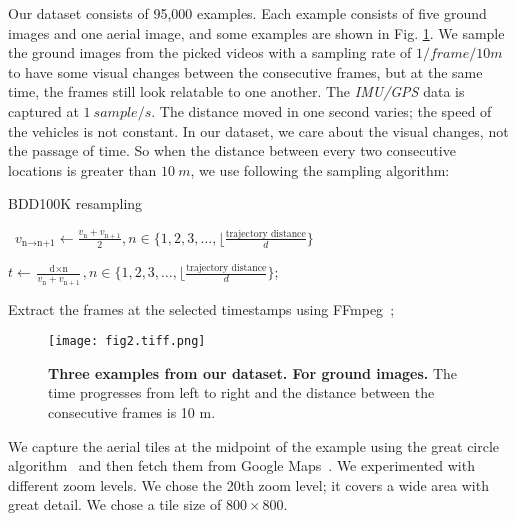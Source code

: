 \documentclass[10pt,letterpaper]{article}
\newif\ifhighlight
\newcommand{\hlb}[1]{\ifhighlight{\hl{#1}}\else{#1}\fi}
\newif\ifmaps
\newcommand{\maps}[1]{\ifmaps{#1}\fi}
\begin{document}
Our dataset consists of 95,000 examples. Each example consists of five ground images and one aerial image, and some examples are shown in \hlb{Fig.} \ref{fig2}. We sample the ground images from the picked videos with a sampling rate of $1 / frame/10 m$ to have some visual changes between the consecutive frames, but at the same time, the frames still look relatable to one another. The \emph{IMU/GPS} data is captured at $1 \ sample/s$. The distance moved in one second varies; the speed of the vehicles is not constant. In our dataset, we care about the visual changes, not the passage of time. So when the distance between every two consecutive locations is greater than $10 \ m$,  we use following the sampling algorithm:

\begin{algorithm}[!h]
\caption{BDD100K resampling}
\
$v_{\text{n} \to \text{n+1}} \gets \frac{v_{\text{n}} + v_{\text{n} + 1}}{2}, n \in \{1, 2, 3, \text{\ldots}, \lfloor\frac{\text{trajectory distance}}{d} \}$ \;

\Comment{To get the timestamp of the nth frame ($t_{\text{n}}$)}

$t \gets \frac{\text{d} \times  \text{n}}{v_{\text{n}} + v_{\text{n} + 1}} , n \in \{1, 2, 3, \text{\ldots}, \lfloor\frac{\text{trajectory distance}}{d} \} $;\

Extract the frames at the selected timestamps using FFmpeg~\cite{bib23};\
\end{algorithm}

\begin{figure}[!ht]
  \caption{{\bf Three examples from our dataset. For ground images.} The time progresses from left to right and the distance between the consecutive frames is 10 m.}
  \texttt{[image: fig2.tiff.png]}
  \label{fig2}
\end{figure}

We capture the aerial tiles at the midpoint of the example using the great circle algorithm~\cite{bib16} and then fetch them from Google Maps~\cite{bib15}. We experimented with different zoom levels\maps{, \hlb{Fig.} \ref{fig3}}. We chose the 20th zoom level; it covers a wide area with great detail. We chose a tile size of  $800 \times 800$\maps{ as shown in \hlb{Fig.} \ref{fig4}}.
\end{document}
